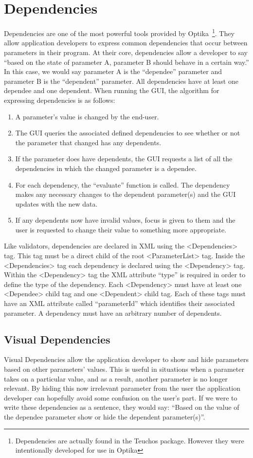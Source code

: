 \section{Dependencies}
Dependencies are one of the most powerful tools provided by Optika~\footnote{Dependencies are actually found in the Teuchos package. However they were 
intentionally developed for use in Optika}.
They allow application developers to express common dependencies that occur between
parameters in their program. At their core, dependencies allow a developer to say ``based on the state of parameter A, parameter B should
behave in a certain way.'' In this case, we would say parameter A is the ``dependee'' parameter and parameter B is the ``dependent'' parameter.
All dependencies have at least one dependee and one dependent. When running the GUI, the algorithm for expressing dependencies is as follows:
\begin{enumerate}
	\item A parameter's value is changed by the end-user.
	\item The GUI queries the associated defined dependencies to see whether or not the parameter that changed has any dependents.
	\item If the parameter does have dependents, the GUI requests a list of all the dependencies in which the changed
	parameter is a dependee.
	\item For each dependency, the ``evaluate'' function is called. The dependency makes any necessary changes to the dependent parameter(s)
	and the GUI updates with the new data.
	\item If any dependents now have invalid values, focus is given to them and the user is requested to change their value to
	something more appropriate.
\end{enumerate}

Like validators, dependencies are declared in XML using the <Dependencies> tag. This tag must be a direct child
of the root <ParameterList> tag. Inside the <Dependencies> tag each dependency is declared using the <Dependency> tag. Within the
<Dependency> tag the XML attribute ``type'' is required in order to define the type of the dependency. Each <Dependency> must have at least
one <Dependee> child tag and one <Dependent> child tag. Each of these tags must have an XML attribute called ``parameterId'' which identifies
their associated parameter. A dependency must have an arbitrary number of dependents.

\subsection{Visual Dependencies}
Visual Dependencies allow the application developer to show and hide parameters based on other parameters' values. This is useful in situations
when a parameter takes on a particular value, and as a result, another parameter is no longer relevant. By hiding this now irrelevant parameter from the user the
application developer can hopefully avoid some confusion on the user's part. If we were to write these dependencies as a sentence, they would say: ``Based on
the value of the dependee parameter show or hide the dependent parameter(s)''.

